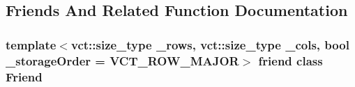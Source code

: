 \subsection{Friends And Related Function Documentation}
\hypertarget{classnmr_s_v_d_fixed_size_data_a7f8321d57e81bc613d5dbef3410ba70e}{
\subsubsection[{Friend}]{\setlength{\rightskip}{0pt plus 5cm}template$<$vct\-::size\-\_\-type \-\_\-rows, vct\-::size\-\_\-type \-\_\-cols, bool \-\_\-storage\-Order = V\-C\-T\-\_\-\-R\-O\-W\-\_\-\-M\-A\-J\-O\-R$>$ friend class {\bf Friend}\hspace{0.3cm}{\ttfamily [friend]}}}\label{classnmr_s_v_d_fixed_size_data_a7f8321d57e81bc613d5dbef3410ba70e}


